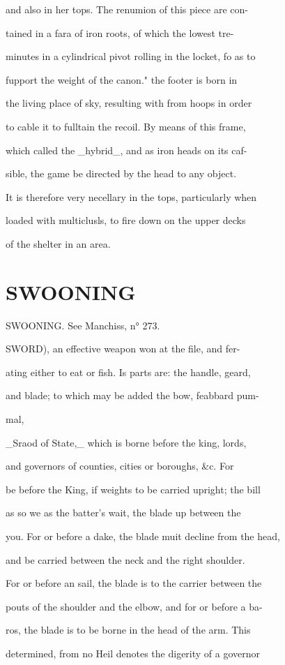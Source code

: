 \documentclass{article}
\begin{document}
and also in her tops. The renumion of this piece are con-

tained in a fara of iron roots, of which the lowest tre-

minutes in a cylindrical pivot rolling in the locket, fo as to

fupport the weight of the canon." the footer is born in

the living place of sky, resulting with from hoops in order

to cable it to fulltain the recoil. By means of this frame,

which called the \_hybrid\_, and as iron heads on its caf-

sible, the game be directed by the head to any object.

It is therefore very necellary in the tops, particularly when

loaded with multiclusls, to fire down on the upper decks

of the shelter in an area.

\section*{SWOONING}
SWOONING. See Manchiss, n° 273.

SWORD), an effective weapon won at the file, and fer-

ating either to eat or fish. Is parts are: the handle, geard,

and blade; to which may be added the bow, feabbard pum-

mal,

\_Sraod of State,\_ which is borne before the king, lords,

and governors of counties, cities or boroughs, \&c. For

be before the King, if weights to be carried upright; the bill

as so we as the batter's wait, the blade up between the

you. For or before a dake, the blade muit decline from the head,

and be carried between the neck and the right shoulder.

For or before an sail, the blade is to the carrier between the

pouts of the shoulder and the elbow, and for or before a ba-

ros, the blade is to be borne in the head of the arm. This

determined, from no Heil denotes the digerity of a governor
\end{document}
